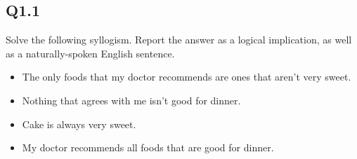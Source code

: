 \documentclass{article}
\begin{document}
\subsection*{Q1.1}
Solve the following syllogism. Report the answer as a logical implication, as well as a naturally-spoken English sentence.
\begin{itemize}
    \item The only foods that my doctor recommends are ones that aren't very sweet.
    \item Nothing that agrees with me isn't good for dinner.
    \item Cake is always very sweet.
    \item My doctor recommends all foods that are good for dinner.
\end{itemize}
\newpage
{}
\end{document}
